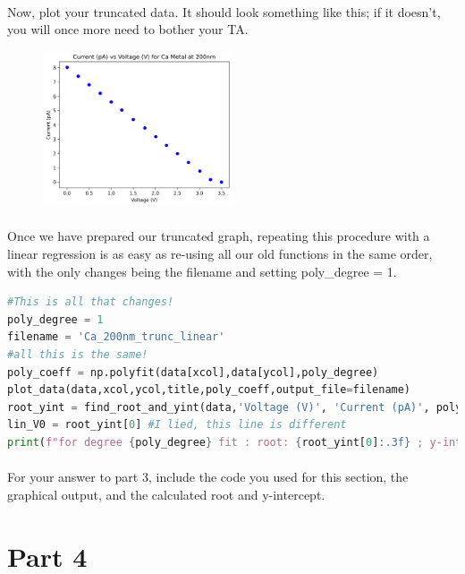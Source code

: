 \documentclass{journal}
\begin{document}
\paragraph{}
Now, plot your truncated data. It should look something like this; if it doesn't, you will once more need to bother your TA.
    \begin{figure}[H]
        \centering
        \includegraphics[width=0.5\textwidth]{./Ca_200nm_trunc.png}
    \end{figure}

\paragraph{}
Once we have prepared our truncated graph, repeating this procedure with a linear regression is as easy as re-using all our old functions in the same order, with the only changes being the filename and setting poly\_degree = 1.
\begin{lstlisting}[language=python]
#This is all that changes!
poly_degree = 1
filename = 'Ca_200nm_trunc_linear'
#all this is the same!
poly_coeff = np.polyfit(data[xcol],data[ycol],poly_degree)
plot_data(data,xcol,ycol,title,poly_coeff,output_file=filename)
root_yint = find_root_and_yint(data,'Voltage (V)', 'Current (pA)', poly_degree)
lin_V0 = root_yint[0] #I lied, this line is different
print(f"for degree {poly_degree} fit : root: {root_yint[0]:.3f} ; y-intercept: {root_yint[1]:.3f}")       
\end{lstlisting}
\paragraph{}
For your answer to part 3, include the code you used for this section, the graphical output, and the calculated root and y-intercept.



\section*{Part 4}
\end{document}
